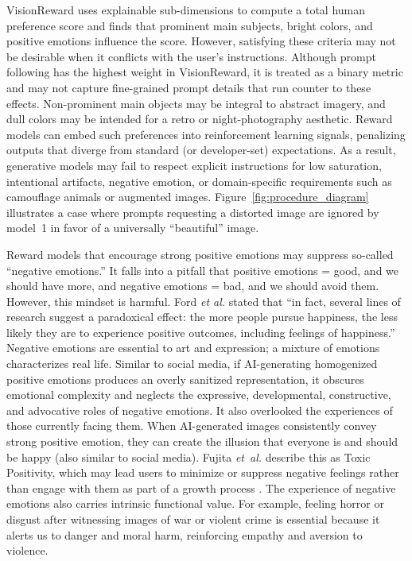 VisionReward \cite{xu_visionreward_2025} uses explainable sub-dimensions to compute a total human preference score and finds that prominent main subjects, bright colors, and positive emotions influence the score. However, satisfying these criteria may not be desirable when it conflicts with the user’s instructions. Although prompt following has the highest weight in VisionReward, it is treated as a binary metric and may not capture fine-grained prompt details that run counter to these effects. Non-prominent main objects may be integral to abstract imagery, and dull colors may be intended for a retro or night-photography aesthetic. Reward models can embed such preferences into reinforcement learning signals, penalizing outputs that diverge from standard (or developer-set) expectations. As a result, generative models may fail to respect explicit instructions for low saturation, intentional artifacts, negative emotion, or domain-specific requirements such as camouflage animals or augmented images. Figure~\ref{fig:procedure_diagram} illustrates a case where prompts requesting a distorted image are ignored by model~1 in favor of a universally ``beautiful'' image.

Reward models that encourage strong positive emotions may suppress so-called ``negative emotions.'' It falls into a pitfall that positive emotions = good, and we should have more, and negative emotions = bad, and we should avoid them. However, this mindset is harmful. Ford \textit{et al.} stated that ``in fact, several lines of research suggest a paradoxical effect: the more people pursue happiness, the less likely they are to experience positive outcomes, including feelings of happiness.'' \cite{gruber_paradoxical_2014} Negative emotions are essential to art and expression; a mixture of emotions characterizes real life. Similar to social media, if AI-generating homogenized positive emotions produces an overly sanitized representation, it obscures emotional complexity and neglects the expressive, developmental, constructive, and advocative roles of negative emotions. It also overlooked the experiences of those currently facing them. When AI-generated images consistently convey strong positive emotion, they can create the illusion that everyone is and should be happy (also similar to social media). Fujita \textit{et~al.} \cite{fujita_pressure_2025} describe this as Toxic Positivity, which may lead users to minimize or suppress negative feelings rather than engage with them as part of a growth process \cite{upadhyay_towards_2022}. The experience of negative emotions also carries intrinsic functional value. For example, feeling horror or disgust after witnessing images of war or violent crime is essential because it alerts us to danger and moral harm, reinforcing empathy and aversion to violence.

